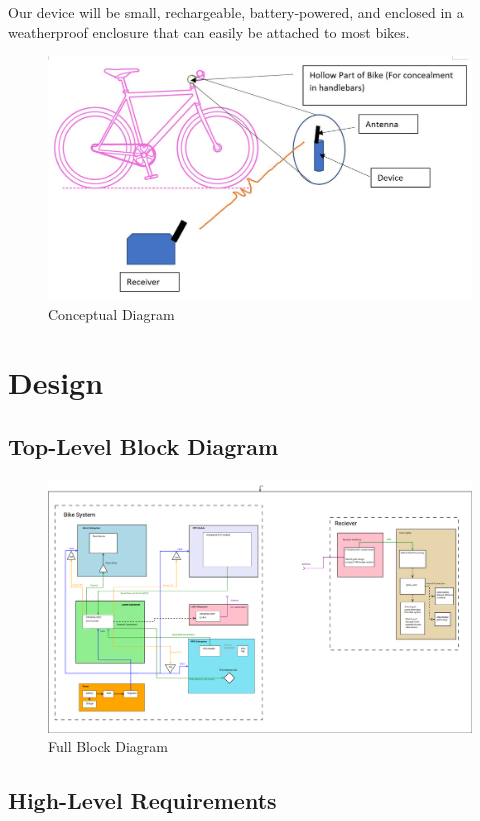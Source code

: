 \documentclass{article}
\begin{document}
Our device will be small, rechargeable, battery-powered, and enclosed in a weatherproof enclosure that can easily be attached to most bikes.

\begin{figure}[H]
	\includegraphics[width=\textwidth]{visual_aid.JPG}
	\caption{Conceptual Diagram}
\end{figure}

\section{Design}
\subsection{Top-Level Block Diagram}

\begin{figure}[H]
	\includegraphics[width=\textwidth]{block_diagram_full.png}
	\caption{Full Block Diagram}
\end{figure}

\subsection{High-Level Requirements}
\end{document}
